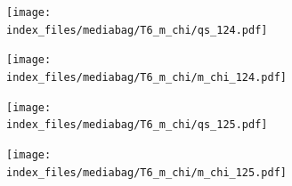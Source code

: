 \documentclass[
  11pt,
  letterpaper,
]{scrreprt}
\begin{document}
\begin{figure}

\begin{minipage}{0.50\linewidth}

\begin{figure}[H]

{\centering \texttt{[image: index\_files/mediabag/T6\_m\_chi/qs\_124.pdf]}

}


\end{figure}%

\end{minipage}%
%
\begin{minipage}{0.50\linewidth}

\begin{figure}[H]

{\centering \texttt{[image: index\_files/mediabag/T6\_m\_chi/m\_chi\_124.pdf]}

}


\end{figure}%

\end{minipage}%

\end{figure}%

\begin{figure}

\begin{minipage}{0.50\linewidth}

\begin{figure}[H]

{\centering \texttt{[image: index\_files/mediabag/T6\_m\_chi/qs\_125.pdf]}

}


\end{figure}%

\end{minipage}%
%
\begin{minipage}{0.50\linewidth}

\begin{figure}[H]

{\centering \texttt{[image: index\_files/mediabag/T6\_m\_chi/m\_chi\_125.pdf]}

}


\end{figure}%

\end{minipage}%

\end{figure}%
\end{document}

